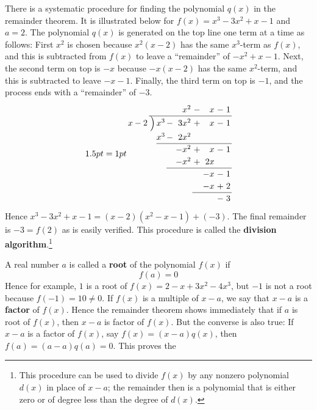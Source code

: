 There is a systematic procedure for finding the polynomial $q(x)$ in the remainder theorem. It is illustrated below for $f(x) = x^{3} - 3x^{2} + x - 1$ and $a = 2$. The polynomial $q(x)$ is generated on the top line one term at a time as follows: First $x^{2}$ is chosen because $x^{2}(x - 2)$ has the same $x^{3}$-term as $f(x)$, and this is subtracted from $f(x)$ to leave a ``remainder'' of $-x^{2} + x - 1$. Next, the second term on top is $-x$ because $-x(x - 2)$ has the same $x^{2}$-term, and this is subtracted to leave $-x - 1$. Finally, the third term on top is $-1$, and the process ends with a ``remainder'' of $-3$.
\begin{equation*}
\arraycolsep=1pt
\def\arraystretch{1.2}
\begin{array}{rr @{\hskip\arraycolsep}c@{\hskip\arraycolsep} rrrrrr}
 & & & & x^2 & - & x & - & 1 \\
\cline{2-9} 
x-2 & \Big) & x^3 & - & 3x^2 & + & x & - & 1 \\
& & x^3 & - & 2x^2 & & & & \\
\cline{3-9}
& & &  & -x^2 & + & x & - & 1 \\
& & &  & -x^2 & + & 2x &  &  \\
\cline{4-9}
& & & & &  & -x& - & 1 \\
& & & & &  & -x& + & 2 \\
\cline{6-9}
& & & & & & & - & 3 
\end{array}
\end{equation*}
Hence $x^{3} - 3x^{2} + x - 1 = (x - 2)(x^{2} - x - 1) + (-3)$. The final remainder is $-3 = f(2)$ as is easily verified. This procedure is called the \textbf{division algorithm}.\footnote{This procedure can be used to divide $f(x)$ by any nonzero polynomial $d(x)$ in place of $x - a$; the remainder then is a polynomial that is either zero or of degree less than the degree of $d(x)$.}



A real number $a$ is called a \textbf{root} of the polynomial $f(x)$ if 
\begin{equation*}
f(a) = 0
\end{equation*}
Hence for example, $1$ is a root of $f(x) = 2 - x + 3x^{2} - 4x^{3}$, but $-1$ is not a root because $f(-1) = 10 \neq 0$. If $f(x)$ is a multiple of $x - a$, we say that $x - a$ is a \textbf{factor} of $f(x)$. Hence the remainder theorem shows immediately that if $a$ is root of $f(x)$, then $x - a$ is factor of $f(x)$. But the converse is also true: If $x - a$ is a factor of $f(x)$, say $f(x) = (x - a) q(x)$, then $f(a) = (a - a)q(a) = 0$. This proves the

